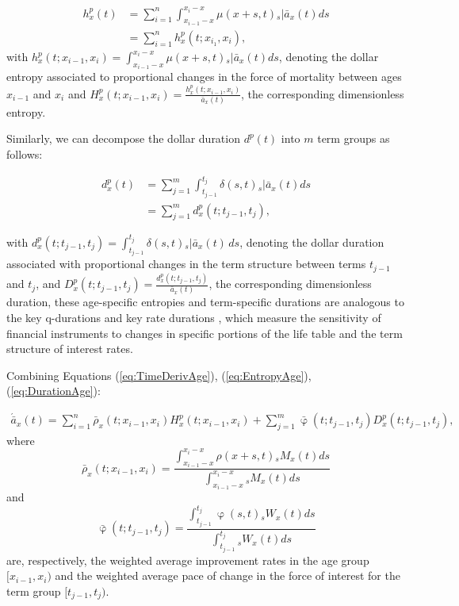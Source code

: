 \documentclass[12pt]{article}
\begin{document}
\begin{equation} \label{eq:EntropyAge}
\begin{split}
{h}^{p}_{x}(t) &=  \sum_{i=1}^n\int_{x_{i-1}-x}^{x_i-x} \mu(x+s,t)   {}_s|\bar{a}_x(t) ds \\
&=  \sum_{i=1}^n {h}^{p}_{x}(t;x_{i_1},x_{i}),
\end{split}
\end{equation}
with ${h}^{p}_{x}(t;x_{i-1},x_{i})=\int_{x_{i-1}-x}^{x_i-x} \mu(x+s,t)   {}_s|\bar{a}_x(t) ds$, denoting the dollar entropy associated to proportional changes in the force of mortality between ages $x_{i-1}$ and $x_{i}$ and ${H}^{p}_{x}(t;x_{i-1},x_{i}) = \frac{{h}^{p}_{x}(t;x_{i-1},x_{i})}{\bar{a}_x(t)}$, the corresponding dimensionless entropy. 

Similarly, we can decompose the dollar duration $d^p(t)$ into $m$ term groups as follows:

\begin{equation}\label{eq:DurationAge}
\begin{split}
{d}^{p}_{x}(t) &= \sum_{j=1}^m\int_{t_{j-1}}^{t_j} \delta(s,t) {}_s|\bar{a}_x(t)ds \\
&= \sum_{j=1}^m {d}^{p}_{x}(t;t_{j-1},t_{j}),
\end{split}
\end{equation}


with ${d}^{p}_{x}(t;t_{j-1},t_{j}) = \int_{t_{j-1}}^{t_j} \delta(s,t) {}_s|\bar{a}_x(t) \, ds$, denoting the dollar duration associated with proportional changes in the term structure between terms $t_{j-1}$ and $t_{j}$, and ${D}^{p}_{x}(t;t_{j-1},t_{j}) = \frac{{d}^{p}_{x}(t;t_{j-1},t_{j})}{\bar{a}_x(t)}$, the corresponding dimensionless duration, these age-specific entropies and term-specific durations are analogous to the key q-durations \citep{li2012key} and key rate durations \citep{Ho1992}, which measure the sensitivity of financial instruments to changes in specific portions of the life table and the term structure of interest rates.



Combining Equations (\ref{eq:TimeDerivAge}), (\ref{eq:EntropyAge}), (\ref{eq:DurationAge}):  

\begin{equation}\label{eq:TimeDerivAge2}
\begin{split}
 \acute{\bar{a}}_x(t) = \sum_{i=1}^n\bar{\rho}_x(t;x_{i-1}, x_i){H}^{p}_x(t;x_{i-1}, x_i) +\sum_{j=1}^m\bar{\upvarphi}(t;t_{j-1},t_{j}){D}^{p}_x(t;t_{j-1},t_{j}),  
\end{split}
\end{equation}
where $$\bar{\rho}_x(t;x_{i-1}, x_i)= \frac{\int_{x_{i-1}-x}^{x_i-x} \rho(x+s,t) {}_sM_x(t)  ds}{\int_{x_{i-1}-x}^{x_i-x}  {}_sM_x(t)ds}$$ and 
$$\bar{\upvarphi}(t;t_{j-1},t_{j})= \frac{\int_{t_{j-1}}^{t_{j}} \upvarphi(s,t) {}_sW_x(t)  ds}{\int_{t_{j-1}}^{t_{j}} {}_sW_x(t) ds}$$ are, respectively, the weighted average improvement rates in the age group $[x_{i-1},x_{i})$ and the weighted average pace of change in the force of interest for the term group $[t_{j-1},t_{j})$. 
\end{document}
